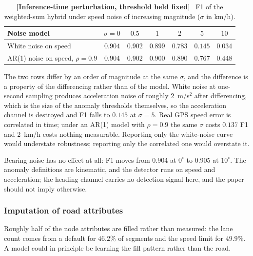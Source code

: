 \documentclass[journal]{IEEEtran}
\begin{document}
\begin{table}[!t]
  \centering
  \caption{\textbf{[Inference-time perturbation, threshold held fixed]}~ F1 of
  the weighted-sum hybrid under speed noise of increasing magnitude
  ($\sigma$ in km/h).}
  \label{tab:noise}
  \renewcommand{\arraystretch}{1.2}
  \footnotesize
  \setlength{\tabcolsep}{4pt}
  \begin{tabular}{@{}lcccccc@{}}
    \toprule
    \textbf{Noise model} & $\sigma = 0$ & $0.5$ & $1$ & $2$ & $5$ & $10$ \\ \midrule
    White noise on speed & $0.904$ & $0.902$ & $0.899$ & $0.783$ & $0.145$ & $0.034$ \\
    AR(1) noise on speed, $\rho = 0.9$ & $0.904$ & $0.902$ & $0.900$ & $0.890$ & $0.767$ & $0.448$ \\
    \bottomrule
  \end{tabular}
\end{table}

The two rows differ by an order of magnitude at the same $\sigma$, and the
difference is a property of the differencing rather than of the model. White
noise at one-second sampling produces acceleration noise of roughly
$2$~m/s$^2$ after differencing, which is the size of the anomaly thresholds
themselves, so the acceleration channel is destroyed and F1 falls to $0.145$
at $\sigma = 5$. Real GPS speed error is correlated in time; under an AR(1)
model with $\rho = 0.9$ the same $\sigma$ costs $0.137$ F1 and $2$~km/h costs
nothing measurable. Reporting only the white-noise curve would understate
robustness; reporting only the correlated one would overstate it.

Bearing noise has no effect at all: F1 moves from 0.904 at
$0^{\circ}$ to 0.905 at $10^{\circ}$. The anomaly definitions are
kinematic, and the detector runs on speed and acceleration; the heading
channel carries no detection signal here, and the paper should not imply
otherwise.

\subsubsection{Imputation of road attributes}
Roughly half of the node attributes are filled rather than measured: the lane
count comes from a default for $46.2\%$ of segments and the speed limit for
$49.9\%$. A model could in principle be learning the fill pattern rather than
the road.
\end{document}
